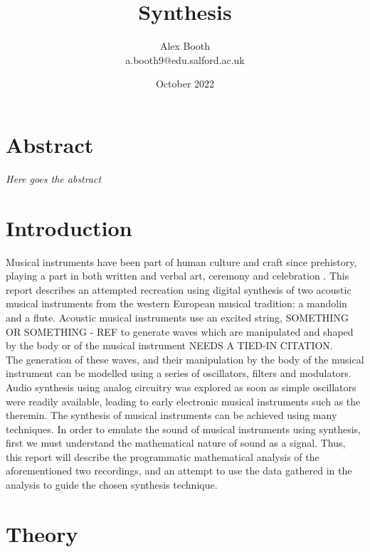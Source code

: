 \documentclass{article}
\title{Synthesis}
\author{Alex Booth\\ a.booth9@edu.salford.ac.uk}
\date{October 2022}
\begin{document}
\maketitle
\section{Abstract}
    \textit{Here goes the abstract}
\section{Introduction}
    Musical instruments have been part of human culture and craft since prehistory, playing a part in both written and verbal art, ceremony and celebration \cite{rault}.
    This report describes an attempted recreation using digital synthesis of two acoustic musical instruments from the western European musical tradition: a mandolin and a flute.
    Acoustic musical instruments use an excited string, SOMETHING OR SOMETHING - REF to generate waves which are manipulated and shaped by the body or of the musical instrument NEEDS A TIED-IN CITATION. %
    \\
    The generation of these waves, and their manipulation by the body of the musical instrument can be modelled using a series of oscillators, filters and modulators.
    Audio synthesis using analog circuitry was explored as soon as simple oscillators were readily available, leading to early electronic musical instruments such as the theremin.  %
    The synthesis of musical instruments can be achieved using many techniques.
    In order to emulate the sound of musical instruments using synthesis, first we must understand the mathematical nature of sound as a signal.
    Thus, this report will describe the programmatic mathematical analysis of the aforementioned two recordings, and an attempt to use the data gathered in the analysis to guide the chosen synthesis technique. 
    

\section{Theory}
\end{document}
